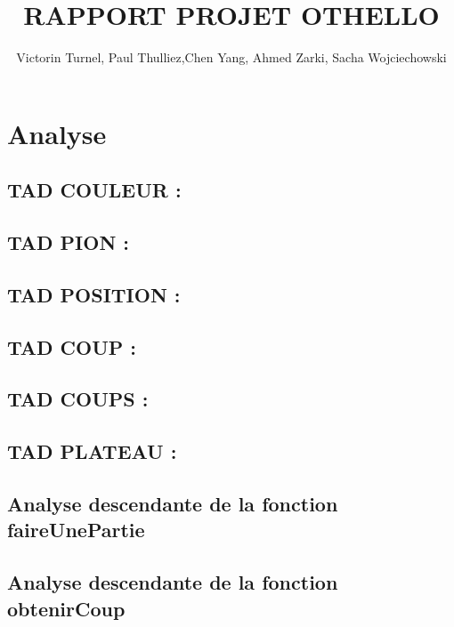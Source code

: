 \documentclass{article}
\title{RAPPORT PROJET OTHELLO}
\author{Victorin Turnel, Paul Thulliez,Chen Yang, Ahmed Zarki, Sacha Wojciechowski}
\begin{document}
\maketitle



\section{Analyse}

\subsection{TAD COULEUR :}


\subsection{TAD PION :}


\subsection{TAD POSITION :}


\subsection{TAD COUP :}


\subsection{TAD COUPS :}


\subsection{TAD PLATEAU :}


\subsection{Analyse descendante de la fonction faireUnePartie}


\subsection{Analyse descendante de la fonction obtenirCoup}
\end{document}
